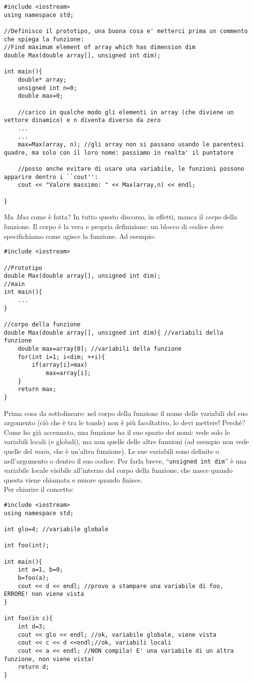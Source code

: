 \begin{lstlisting}
#include <iostream>
using namespace std;

//Definisco il prototipo, una buona cosa e' metterci prima un commento che spiega la funzione:
//Find maximum element of array which has dimension dim
double Max(double array[], unsigned int dim); 

int main(){
	double* array;
	unsigned int n=0;
	double max=0;
	
	//carico in qualche modo gli elementi in array (che diviene un vettore dinamico) e n diventa diverso da zero
	...
	...
	max=Max(array, n); //gli array non si passano usando le parentesi quadre, ma solo con il loro nome: passiamo in realta' il puntatore
	
	//posso anche evitare di usare una variabile, le funzioni possono apparire dentro i ``cout'':
	cout << "Valore massimo: " << Max(array,n) << endl;
	
}
\end{lstlisting}

Ma \emph{Max} come è fatta? In tutto questo discorso, in effetti, manca il \emph{corpo} della funzione. Il corpo è la vera e propria definizione: un blocco di codice dove specifichiamo come agisce la funzione.  Ad esempio:
\begin{lstlisting}
#include <iostream>

//Prototipo
double Max(double array[], unsigned int dim);
//main
int main(){
	...
}

//corpo della funzione
double Max(double array[], unsigned int dim){ //variabili della funzione
	double max=array[0]; //variabili della funzione
	for(int i=1; i<dim; ++i){
		if(array[i]>max)
			max=array[i];	
	}
	return max;
}
\end{lstlisting}

Prima cosa da sottolineare: nel corpo della funzione il nome delle variabili del suo argomento (ciò che è tra le tonde) non è più facoltativo, lo devi mettere! Perché? Come ho già accennato, una funzione ha il suo spazio dei nomi: vede solo le variabili locali (e globali), ma non quelle delle altre funzioni (ad esempio non vede quelle del \emph{main}, che è un'altra funzione). Le sue variabili sono definite o nell'argomento o dentro il suo codice. Per farla breve, ``\lstinline|unsigned int dim|'' è una variabile locale visibile all'interno del corpo della funzione, che nasce quando questa viene chiamata e muore quando finisce.\\

Per chiarire il concetto:
\begin{lstlisting}
#include <iostream>
using namespace std;

int glo=4; //variabile globale

int foo(int);

int main(){
	int a=1, b=0;
	b=foo(a);
	cout << d << endl; //provo a stampare una variabile di foo, ERRORE! non viene vista
}

int foo(in c){
	int d=3;
	cout << glo << endl; //ok, variabile globale, viene vista
	cout << c << d <<endl;//ok, variabili locali
	cout << a << endl; //NON compila! E' una variabile di un altra funzione, non viene vista!
	return d;
}
\end{lstlisting}

